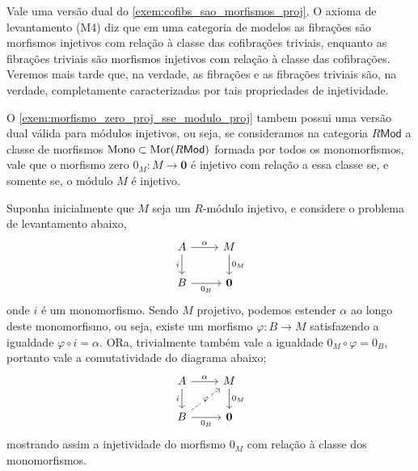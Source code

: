 \begin{exem}\label{exem:fibs_sao_morfismos_inj}
  Vale uma versão dual do \cref{exem:cofibs_sao_morfismos_proj}.
  O axioma de levantamento (M4) diz que em uma categoria de modelos as fibrações são morfismos injetivos com relação à classe das cofibrações triviais, enquanto as fibrações triviais são morfismos injetivos com relação à classe das cofibrações.
  Veremos mais tarde que, na verdade, as fibrações e as fibrações triviais são, na verdade, completamente caracterizadas por tais propriedades de injetividade.
\end{exem}

\begin{exem}\label{exem:morfismo_zero_inj_sse_modulo_inj}
  O \cref{exem:morfismo_zero_proj_sse_modulo_proj} tambem possui uma versão dual válida para módulos injetivos, ou seja, se consideramos na categoria $R\mathsf{Mod}$ a classe de morfismos $\mathrm{Mono} \subset \mathrm{Mor}(R\mathsf{Mod})$ formada por todos os monomorfismos, vale que o morfismo zero $0_M: M \to \mathbf{0}$ é injetivo com relação a essa classe se, e somente se, o módulo $M$ é injetivo.

  Suponha inicialmente que $M$ seja um $R$-módulo injetivo, e considere o problema de levantamento abaixo,
  \begin{displaymath}
    \begin{tikzcd}
      A
      \arrow[r, "\alpha"]
      \arrow[d, "i" swap]
      & M
      \arrow[d, "0_M"]
      \\ B
      \arrow[r, "0_B" swap]
      & \mathbf{0}
    \end{tikzcd}
  \end{displaymath}
  onde $i$ é um monomorfismo.
  Sendo $M$ projetivo, podemos estender $\alpha$ ao longo deste monomorfismo, ou seja, existe um morfismo $\varphi: B \to M$ satisfazendo a igualdade $\varphi \circ i = \alpha$.
  ORa, trivialmente também vale a igualdade $0_M \circ \varphi = 0_B$, portanto vale a comutatividade do diagrama abaixo;
  \begin{displaymath}
    \begin{tikzcd}
      A
      \arrow[r, "\alpha"]
      \arrow[d, "i" swap]
      & M
      \arrow[d, "0_M"]
      \\ B
      \arrow[r, "0_B" swap]
      \arrow[ru, dashed, "\varphi" description]
      & \mathbf{0}
    \end{tikzcd}
  \end{displaymath}
  mostrando assim a injetividade do morfismo $0_M$ com relação à classe dos monomorfismos.


\end{exem}
